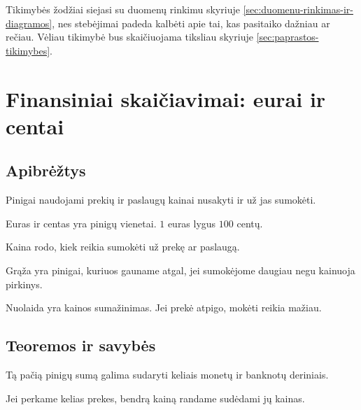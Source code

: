 Tikimybės žodžiai siejasi su duomenų rinkimu skyriuje \ref{sec:duomenu-rinkimas-ir-diagramos}, nes stebėjimai padeda kalbėti apie tai, kas pasitaiko dažniau ar rečiau. Vėliau tikimybė bus skaičiuojama tiksliau skyriuje \ref{sec:paprastos-tikimybes}.

\section{Finansiniai skaičiavimai: eurai ir centai}\label{sec:finansiniai-skaiciavimai-eurai-ir-centai}

\subsection{Apibrėžtys}

\begin{apibreztis}
Pinigai naudojami prekių ir paslaugų kainai nusakyti ir už jas sumokėti.
\end{apibreztis}

\begin{apibreztis}
Euras ir centas yra pinigų vienetai. \(1\) euras lygus \(100\) centų.
\end{apibreztis}

\begin{apibreztis}
Kaina rodo, kiek reikia sumokėti už prekę ar paslaugą.
\end{apibreztis}

\begin{apibreztis}
Grąža yra pinigai, kuriuos gauname atgal, jei sumokėjome daugiau negu kainuoja pirkinys.
\end{apibreztis}

\begin{apibreztis}
Nuolaida yra kainos sumažinimas. Jei prekė atpigo, mokėti reikia mažiau.
\end{apibreztis}

\subsection{Teoremos ir savybės}

\begin{savybe}
Tą pačią pinigų sumą galima sudaryti keliais monetų ir banknotų deriniais.
\end{savybe}

\begin{savybe}
Jei perkame kelias prekes, bendrą kainą randame sudėdami jų kainas.
\end{savybe}

